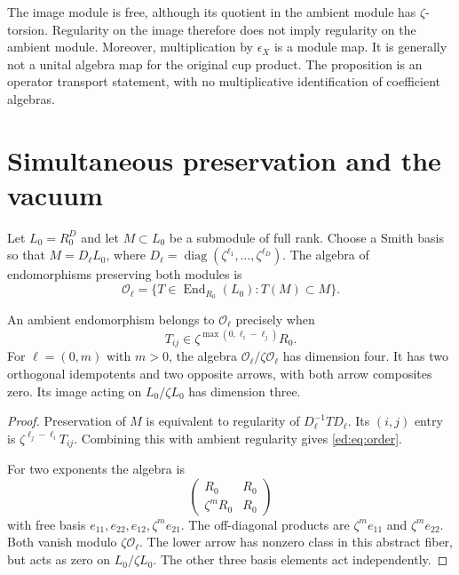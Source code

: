 The image module is free, although its quotient in the ambient module
has $\zeta$-torsion. Regularity on the image therefore does not imply
regularity on the ambient module. Moreover, multiplication by
$\epsilon_X$ is a module map. It is generally not a unital algebra map
for the original cup product. The proposition is an operator transport
statement, with no multiplicative identification of coefficient algebras.

\section{Simultaneous preservation and the vacuum}
\label{ed:sec:order}

Let $L_0=R_0^D$ and let $M\subset L_0$ be a submodule of full rank.
Choose a Smith basis so that
$M=D_\ell L_0$, where
$D_\ell=\operatorname{diag}(\zeta^{\ell_1},\ldots,\zeta^{\ell_D})$.
The algebra of endomorphisms preserving both modules is
\[
 \mathscr O_\ell=
 \{T\in\operatorname{End}_{R_0}(L_0):T(M)\subset M\}.
\]

\begin{proposition}\label{ed:prop:order}
An ambient endomorphism belongs to $\mathscr O_\ell$ precisely when
\begin{equation}\label{ed:eq:order}
 T_{ij}\in\zeta^{\max(0,\ell_i-\ell_j)}R_0.
\end{equation}
For $\ell=(0,m)$ with $m>0$, the algebra
$\mathscr O_\ell/\zeta\mathscr O_\ell$ has dimension four. It has two
orthogonal idempotents and two opposite arrows, with both arrow
composites zero. Its image acting on $L_0/\zeta L_0$ has dimension three.
\end{proposition}

\begin{proof}
Preservation of $M$ is equivalent to regularity of
$D_\ell^{-1}TD_\ell$. Its $(i,j)$ entry is
$\zeta^{\ell_j-\ell_i}T_{ij}$. Combining this with ambient regularity
gives \eqref{ed:eq:order}.

For two exponents the algebra is
\[
 \begin{pmatrix}R_0&R_0\\\zeta^mR_0&R_0\end{pmatrix}
\]
with free basis $e_{11},e_{22},e_{12},\zeta^me_{21}$.
The off-diagonal products are $\zeta^me_{11}$ and
$\zeta^me_{22}$. Both vanish modulo $\zeta\mathscr O_\ell$.
The lower arrow has nonzero class in this abstract fiber, but acts as
zero on $L_0/\zeta L_0$. The other three basis elements act independently.
\end{proof}


